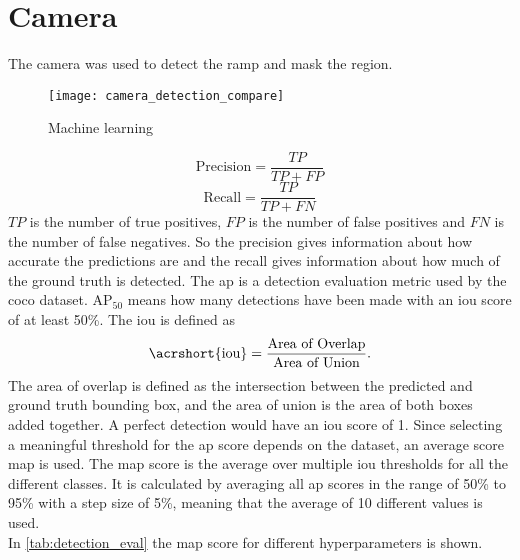 \section{Camera}
The camera was used to detect the ramp and mask the region.
\begin{figure}[htbp]
	\centering
	\texttt{[image: camera\_detection\_compare]}
	\caption{Machine learning}
	\label{fig:camera_detection_compare}
\end{figure}
\begin{equation}
	\text{Precision} = \frac{TP}{TP+FP}
\end{equation}
\begin{equation}
	\text{Recall} = \frac{TP}{TP+FN}
\end{equation}
$TP$ is the number of true positives, $FP$ is the number of false positives and $FN$ is the number of false negatives.
So the precision gives information about how accurate the predictions are and the recall gives information about how much of the ground truth is detected.
The \gls{ap} is a detection evaluation metric used by the \gls{coco} dataset.
$\text{AP}_{50}$ means how many detections have been made with an \gls{iou} score of at least 50\%.
The \gls{iou} is defined as
\begin{equation}
	\text{\acrshort{iou}} = \frac{\text{Area of Overlap}}{\text{Area of Union}}.
\end{equation}
The area of overlap is defined as the intersection between the predicted and ground truth bounding box, and the area of union is the area of both boxes added together.
A perfect detection would have an \gls{iou} score of 1.
Since selecting a meaningful threshold for the \gls{ap} score depends on the dataset, an average score \gls{map} is used.
The \gls{map} score is the average over multiple \gls{iou} thresholds for all the different classes.
It is calculated by averaging all \gls{ap} scores in the range of 50\% to 95\% with a step size of 5\%, meaning that the average of 10 different values is used.\\
In \cref{tab:detection_eval} the \gls{map} score for different hyperparameters is shown.


